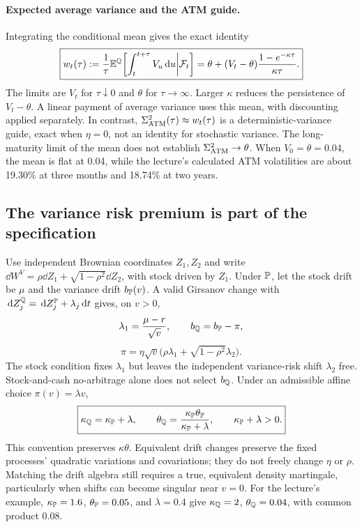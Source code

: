 \paragraph{Expected average variance and the ATM guide.}
Integrating the conditional mean gives the exact identity
\[
\boxed{w_t(\tau):=\frac1\tau\mathbb{E}^{\mathbb{Q}}\!\left[\int_t^{t+\tau}V_u\,\mathrm{d} u
\middle|\mathcal{F}_t\right]
=\theta+(V_t-\theta)\frac{1-e^{-\kappa\tau}}{\kappa\tau}.}
\]
The limits are \(V_t\) for \(\tau\downarrow0\) and \(\theta\) for
\(\tau\to\infty\). Larger \(\kappa\) reduces the persistence of
\(V_t-\theta\). A linear payment of average variance uses this mean,
with discounting applied separately. In contrast,
\(\Sigma_{\rm ATM}^2(\tau)\approx w_t(\tau)\) is a deterministic-variance
guide, exact when \(\eta=0\), not an identity for stochastic variance.
The long-maturity limit of the mean does not establish
\(\Sigma_{\rm ATM}^2\to\theta\). When \(V_0=\theta=0.04\), the mean
is flat at 0.04, while the lecture's calculated ATM volatilities are about
19.30\% at three months and 18.74\% at two years.

\subsection{The variance risk premium is part of the specification}
Use independent Brownian coordinates \(Z_1,Z_2\) and write
\(\dd W^V=\rho\dd Z_1+\sqrt{1-\rho^2}\dd Z_2\), with stock driven by
\(Z_1\). Under \(\mathbb{P}\), let the stock drift be \(\mu\) and the
variance drift \(b_{\mathbb{P}}(v)\). A valid Girsanov change with
\(\,\mathrm{d} Z_j^{\mathbb{Q}}=\,\mathrm{d} Z_j^{\mathbb{P}}+\lambda_j\,\mathrm{d} t\) gives, on \(v>0\),
\[
\lambda_1=\frac{\mu-r}{\sqrt v},\qquad
b_{\mathbb{Q}}=b_{\mathbb{P}}-\pi,
\]
\[
\pi=\eta\sqrt v\bigl(\rho\lambda_1+
\sqrt{1-\rho^2}\lambda_2\bigr).
\]
The stock condition fixes \(\lambda_1\) but leaves the independent
variance-risk shift \(\lambda_2\) free. Stock-and-cash no-arbitrage alone
does not select \(b_{\mathbb{Q}}\). Under an admissible affine choice
\(\pi(v)=\lambda v\),
\[
\boxed{\kappa_{\mathbb{Q}}=\kappa_{\mathbb{P}}+\lambda,\qquad
\theta_{\mathbb{Q}}=\frac{\kappa_{\mathbb{P}}\theta_{\mathbb{P}}}
{\kappa_{\mathbb{P}}+\lambda},\qquad\kappa_{\mathbb{P}}+\lambda>0.}
\]
This convention preserves \(\kappa\theta\). Equivalent drift changes
preserve the fixed processes' quadratic variations and covariations;
they do not freely change \(\eta\) or \(\rho\). Matching the drift
algebra still requires a true, equivalent density martingale, particularly
when shifts can become singular near \(v=0\).
For the lecture's example, \(\kappa_{\mathbb{P}}=1.6\),
\(\theta_{\mathbb{P}}=0.05\), and \(\lambda=0.4\) give
\(\kappa_{\mathbb{Q}}=2\), \(\theta_{\mathbb{Q}}=0.04\), with common product 0.08.


